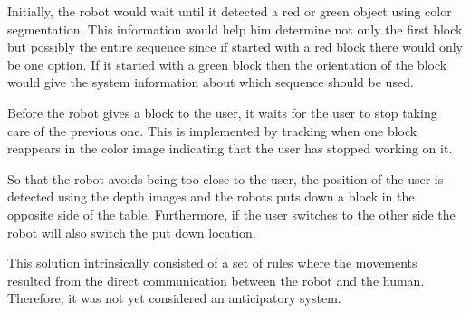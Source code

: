Initially, the robot would wait until it detected a red or green object using color segmentation. This information would help him determine not only the first block but possibly the entire sequence since if started with a red block there would only be one option. If it started with a green block then the orientation of the block would give the system information about which sequence should be used.

Before the robot gives a block to the user, it waits for the user to stop taking care of the previous one. This is implemented by tracking when one block reappears in the color image indicating that the user has stopped working on it.

So that the robot avoids being too close to the user, the position of the user is detected using the depth images and the robots puts down a block in the opposite side of the table. Furthermore, if the user switches to the other side the robot will also switch the put down location.
\fi

This solution intrinsically consisted of a set of rules where the movements resulted from the direct communication between the robot and the human. Therefore, it was not yet considered an anticipatory system.
